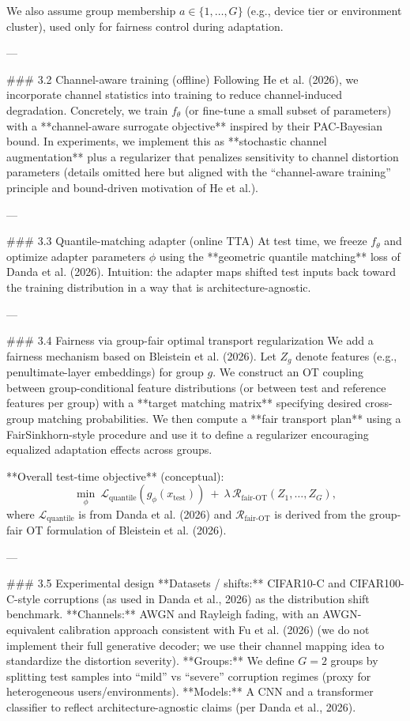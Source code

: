 We also assume group membership \(a \in \{1,\dots,G\}\) (e.g., device tier or environment cluster), used only for fairness control during adaptation.

---

### 3.2 Channel-aware training (offline)  
Following He et al. (2026), we incorporate channel statistics into training to reduce channel-induced degradation. Concretely, we train \(f_\theta\) (or fine-tune a small subset of parameters) with a **channel-aware surrogate objective** inspired by their PAC-Bayesian bound. In experiments, we implement this as **stochastic channel augmentation** plus a regularizer that penalizes sensitivity to channel distortion parameters (details omitted here but aligned with the “channel-aware training” principle and bound-driven motivation of He et al.).

---

### 3.3 Quantile-matching adapter (online TTA)  
At test time, we freeze \(f_\theta\) and optimize adapter parameters \(\phi\) using the **geometric quantile matching** loss of Danda et al. (2026). Intuition: the adapter maps shifted test inputs back toward the training distribution in a way that is architecture-agnostic.

---

### 3.4 Fairness via group-fair optimal transport regularization  
We add a fairness mechanism based on Bleistein et al. (2026). Let \(Z_g\) denote features (e.g., penultimate-layer embeddings) for group \(g\). We construct an OT coupling between group-conditional feature distributions (or between test and reference features per group) with a **target matching matrix** specifying desired cross-group matching probabilities. We then compute a **fair transport plan** using a FairSinkhorn-style procedure and use it to define a regularizer encouraging equalized adaptation effects across groups.

**Overall test-time objective** (conceptual):  
\[
\min_\phi \ \mathcal{L}_{\text{quantile}}(g_\phi(x_{\text{test}})) \ + \ \lambda \, \mathcal{R}_{\text{fair-OT}}(Z_1,\dots,Z_G),
\]
where \(\mathcal{L}_{\text{quantile}}\) is from Danda et al. (2026) and \(\mathcal{R}_{\text{fair-OT}}\) is derived from the group-fair OT formulation of Bleistein et al. (2026).

---

### 3.5 Experimental design  
**Datasets / shifts:** CIFAR10-C and CIFAR100-C-style corruptions (as used in Danda et al., 2026) as the distribution shift benchmark.  
**Channels:** AWGN and Rayleigh fading, with an AWGN-equivalent calibration approach consistent with Fu et al. (2026) (we do not implement their full generative decoder; we use their channel mapping idea to standardize the distortion severity).  
**Groups:** We define \(G=2\) groups by splitting test samples into “mild” vs “severe” corruption regimes (proxy for heterogeneous users/environments).  
**Models:** A CNN and a transformer classifier to reflect architecture-agnostic claims (per Danda et al., 2026).


